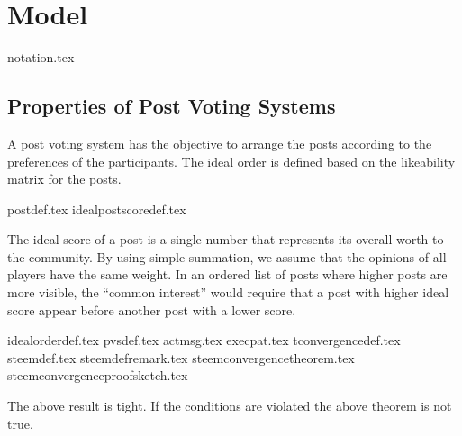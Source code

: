\section{Model}
  {notation.tex}
  \subsection{Properties of Post Voting Systems}
    A post voting system has the objective to arrange the posts according to the
    preferences of the participants. The ideal order is defined based on the
    likeability matrix for the posts.

    {postdef.tex}
    {idealpostscoredef.tex}

    The ideal score of a post is a single number that represents its overall
    worth to the community. By using simple summation, we assume that the
    opinions of all players have the same weight. In an ordered list of posts
    where higher posts are more visible, the ``common interest'' would require
    that a post with higher ideal score appear before another post with a lower
    score.

    {idealorderdef.tex}
    {pvsdef.tex}
    {actmsg.tex}
    {execpat.tex}
    {tconvergencedef.tex}
    {steemdef.tex}
    {steemdefremark.tex}
    {steemconvergencetheorem.tex}
    {steemconvergenceproofsketch.tex}

    The above result is tight.
    If the conditions are violated the above theorem is not true.
